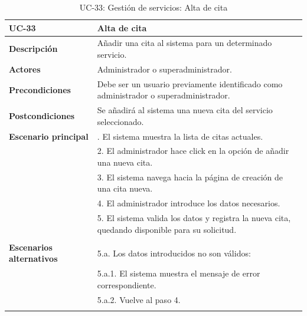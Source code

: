 \begin{table}
  \begin{center}
    \begin{tabularx}{16.4cm}{|l|X|}
      \hline
      \textbf{UC-33} & \textbf{Alta de cita}\\
      \hline
      \textbf{Descripción} & Añadir una cita al sistema para un determinado servicio.\\
      \hline
      \textbf{Actores} & Administrador o superadministrador.\\
      \hline
      \textbf{Precondiciones} & Debe ser un usuario previamente identificado como administrador o superadministrador.\\
      \hline
      \textbf{Postcondiciones} & Se añadirá al sistema una nueva cita del servicio seleccionado.\\
      \hline
      \textbf{Escenario principal} & \smallskip 1. El sistema muestra la lista de citas actuales.\\
      & 2. El administrador hace click en la opción de añadir una nueva cita.\\
      & 3. El sistema navega hacia la página de creación de una cita nueva.\\
      & 4. El administrador introduce los datos necesarios.\\
      & 5. El sistema valida los datos y registra la nueva cita, quedando disponible para su solicitud.\\
      & \\
      \hline
      \textbf{Escenarios alternativos} & \smallskip 5.a. Los datos introducidos no son válidos:\\
      & \hspace{0.3cm} 5.a.1. El sistema muestra el mensaje de error correspondiente.\\
      & \hspace{0.3cm} 5.a.2. Vuelve al paso 4.\\
      & \\
      \hline
    \end{tabularx}
    \caption{UC-33: Gestión de servicios: Alta de cita}
    \label{tab:CU-alta-cita}
  \end{center}
\end{table}


